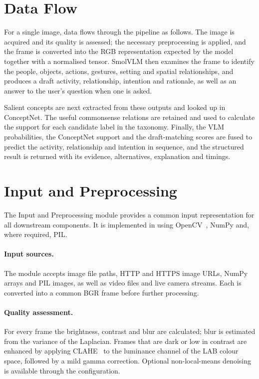 \documentclass[12pt,a4paper,oneside]{report}
\begin{document}
\section{Data Flow}

For a single image, data flows through the pipeline as follows. The image is
acquired and its quality is assessed; the necessary preprocessing is applied,
and the frame is converted into the RGB representation expected by the model
together with a normalised tensor. SmolVLM then examines the frame to identify
the people, objects, actions, gestures, setting and spatial relationships, and
produces a draft activity, relationship, intention and rationale, as well as an
answer to the user's question when one is asked.

Salient concepts are next extracted from these outputs and looked up in
ConceptNet. The useful commonsense relations are retained and used to calculate
the support for each candidate label in the taxonomy. Finally, the VLM
probabilities, the ConceptNet support and the draft-matching scores are fused
to predict the activity, relationship and intention in sequence, and the
structured result is returned with its evidence, alternatives, explanation and
timings.

\section{Input and Preprocessing}
\label{sec:preproc}

The Input and Preprocessing module provides a common input representation for
all downstream components. It is implemented in 
using OpenCV~\cite{bradski2000opencv}, NumPy and, where required, PIL.

\paragraph{Input sources.} The module accepts image file paths, HTTP and HTTPS
image URLs, NumPy arrays and PIL images, as well as video files and live camera
streams. Each is converted into a common BGR frame before further processing.

\paragraph{Quality assessment.} For every frame the brightness, contrast and
blur are calculated; blur is estimated from the variance of the Laplacian.
Frames that are dark or low in contrast are enhanced by applying
CLAHE~\cite{zuiderveld1994clahe} to the luminance channel of the LAB colour
space, followed by a mild gamma correction. Optional non-local-means denoising
is available through the configuration.
\end{document}
